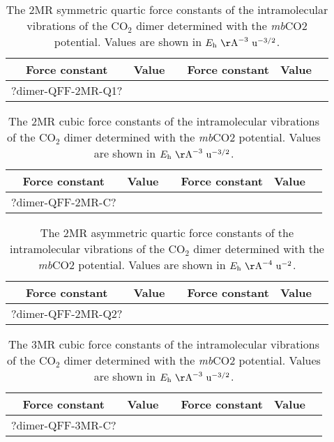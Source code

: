 \documentclass[aip,jcp,showpacs,superscriptaddress,groupedaddress]{revtex4-1}  %
\begin{document}
\begin{table}[]
\centering
\caption{The 2MR symmetric quartic force constants of the intramolecular vibrations of the CO$_2$ dimer determined with the \emph{mb}CO2 potential. Values are shown in $E_{\rm h}\ {\rm \AA}^{-3}\ {\rm u}^{-3/2}$.}
\label{table:qff_dimer-2mr-q1}
\begin{ruledtabular}
\begin{tabular}{cccccc}
Force constant & Value      &  & Force constant & Value      &    \\
\hline \Tstrut
?dimer-QFF-2MR-Q1?
\end{tabular}
\end{ruledtabular}
\end{table}

\begin{table}[]
\centering
\caption{The 2MR cubic force constants of the intramolecular vibrations of the CO$_2$ dimer determined with the \emph{mb}CO2 potential. Values are shown in $E_{\rm h}\ {\rm \AA}^{-3}\ {\rm u}^{-3/2}$.}
\label{table:qff_dimer-2mr-t}
\begin{ruledtabular}
\begin{tabular}{cccccc}
Force constant & Value      &  & Force constant & Value      &    \\
\hline \Tstrut
?dimer-QFF-2MR-C?
\end{tabular}
\end{ruledtabular}
\end{table}

\begin{table}[]
\centering
\caption{The 2MR asymmetric quartic force constants of the intramolecular vibrations of the CO$_2$ dimer determined with the \emph{mb}CO2 potential. Values are shown in $E_{\rm h}\ {\rm \AA}^{-4}\ {\rm u}^{-2}$.}
\label{table:qff_dimer-2mr-q2}
\begin{ruledtabular}
\begin{tabular}{cccccc}
Force constant & Value      &  & Force constant & Value      &    \\
\hline \Tstrut
?dimer-QFF-2MR-Q2?
\end{tabular}
\end{ruledtabular}
\end{table}

\begin{table}[]
\centering
\caption{The 3MR cubic force constants of the intramolecular vibrations of the CO$_2$ dimer determined with the \emph{mb}CO2 potential. Values are shown in $E_{\rm h}\ {\rm \AA}^{-3}\ {\rm u}^{-3/2}$.}
\label{table:qff_dimer-3mr-c}
\begin{ruledtabular}
\begin{tabular}{cccccc}
Force constant & Value      &  & Force constant & Value      &    \\
\hline \Tstrut
?dimer-QFF-3MR-C?
\end{tabular}
\end{ruledtabular}
\end{table}
\end{document}
